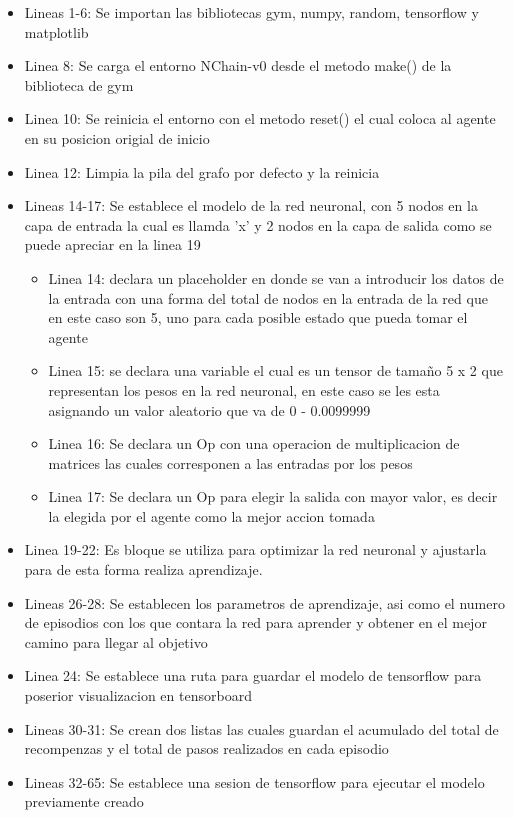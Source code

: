 \begin{itemize}
    \item Lineas 1-6: Se importan las bibliotecas gym, numpy, random, tensorflow y matplotlib
    \item Linea 8: Se carga el entorno NChain-v0 desde el metodo make() de la biblioteca de gym
    \item Linea 10: Se reinicia el entorno con el metodo reset() el cual coloca al agente en su posicion origial de inicio 
    \item Linea 12: Limpia la pila del grafo por defecto y la reinicia    
    \item Lineas 14-17: Se establece el modelo de la red neuronal, con 5 nodos en la capa de entrada la cual es llamda 'x' y 2 nodos en la capa de salida como se puede apreciar en la linea 19
    	\begin{itemize}
    		\item Linea 14: declara un placeholder en donde se van a introducir los datos de la entrada con una forma del total de nodos en la entrada de la red que en este caso son 5, uno para cada posible estado que pueda tomar el agente
    		\item Linea 15: se declara una variable el cual es un tensor de tamaño 5 x 2 que representan los pesos en la red neuronal, en este caso se les esta asignando un valor aleatorio que va de 0 - 0.0099999
    		\item Linea 16: Se declara un Op con una operacion de multiplicacion de matrices las cuales corresponen a las entradas por los pesos
    		\item Linea 17: Se declara un Op para elegir la salida con mayor valor, es decir la elegida por el agente como la mejor accion tomada
    	\end{itemize}
    \item Linea 19-22: Es bloque se utiliza para optimizar la red neuronal y ajustarla para de esta forma realiza aprendizaje.
    \item Lineas 26-28: Se establecen los parametros de aprendizaje, asi como el numero de episodios con los que contara la red para aprender y obtener en el mejor camino para llegar al objetivo
    \item Linea 24: Se establece una ruta para guardar el modelo de tensorflow para poserior visualizacion en tensorboard
    \item Lineas 30-31: Se crean dos listas las cuales guardan el acumulado del total de recompenzas y el total de pasos realizados en cada episodio
    \item Lineas 32-65: Se establece una sesion de tensorflow para ejecutar el modelo previamente creado

\end{itemize}
